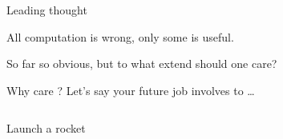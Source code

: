 \begin{frame}{Leading thought}
    \begin{center}
        \alert{
            All computation is wrong, only some is useful.
        }
    \end{center}
    \vspace{4em}
    \begin{center}
        So far so obvious, but to what extend should one care?\\[1em]
    \end{center}
\end{frame}

\begin{frame}{Why care ? \quad Let's say your future job involves to \ldots}
    \begin{columns}[T]
        \smaller
    \begin{column}{0.3\textwidth}
    \begin{block}{Launch a rocket}
        \begin{center}
\end{center}
\end{block}
\end{column}
\end{columns}
\end{frame}
